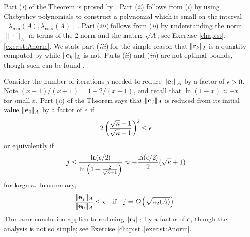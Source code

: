 Part (\emph{i}) of the Theorem is proved by \citet[p.~50]{Greenbaum1997}.  Part (\emph{ii}) follows from (\emph{i}) by using Chebyshev polynomials to construct a polynomial which is small on the interval $[\lambda_{\min}(A),\lambda_{\max}(A)]$ \citep[p.~51]{Greenbaum1997}.  Part (\emph{iii}) follows from (\emph{ii}) by understanding the norm $\|\cdot\|_A$ in terms of the 2-norm and the matrix $\sqrt{A}$; see Exercise \ref{chap:st}.\ref{exer:st:Anorm}.  We state part (\emph{iii}) for the simple reason that $\|\mathbf{r}_k\|_2$ is a quantity computed by \PETSc while $\|\mathbf{e}_k\|_A$ is not.  Parts (\emph{ii}) and (\emph{iii}) are not optimal bounds, though such can be found \citep[p.~51]{Greenbaum1997}.

Consider the number of iterations $j$ needed to reduce $\|\mathbf{e}_j\|_A$ by a factor of $\epsilon>0$.  Note $(x-1)/(x+1) = 1 - 2/(x+1)$, and recall that $\ln(1-x) \approx -x$ for small $x$.  Part (\emph{ii}) of the Theorem says that $\|\mathbf{e}_j\|_A$ is reduced from its initial value $\|\mathbf{e}_0\|_A$ by a factor of $\epsilon$ if
    $$2 \left(\frac{\sqrt{\kappa}-1}{\sqrt{\kappa}+1}\right)^j \le \epsilon$$
or equivalently if
    $$j \le \frac{\ln(\epsilon/2)}{\ln\left(1 - \frac{2}{\sqrt{\kappa}+1}\right)} \approx -\frac{\ln(\epsilon/2)}{2} (\sqrt{\kappa}+1)$$
for large $\kappa$.  In summary,
\begin{equation}
\frac{\|\mathbf{e}_j\|_A}{\|\mathbf{e}_0\|_A} \le \epsilon \quad \text{if} \quad j = O\left(\sqrt{\kappa_2(A)}\right).  \label{cgkappaiter}
\end{equation}
The same conclusion applies to reducing $\|\mathbf{r}_j\|_2$ by a factor of $\epsilon$, though the analysis is not so simple; see Exercise \ref{chap:st}.\ref{exer:st:Anorm}.

